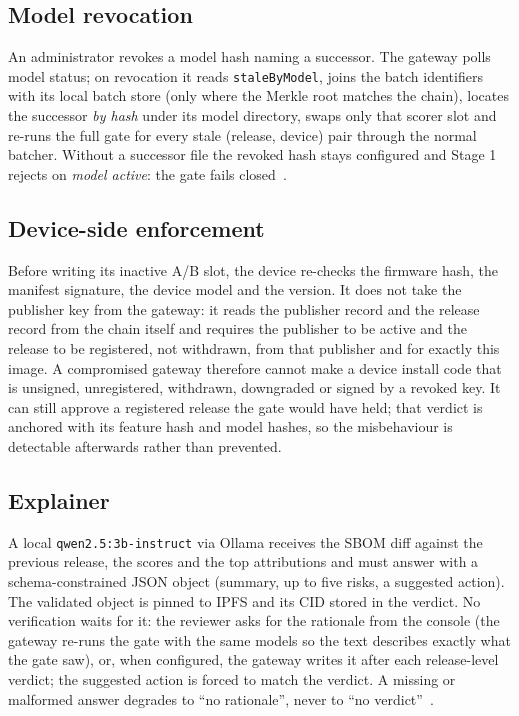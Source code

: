 \documentclass[conference]{IEEEtran}
\begin{document}
\subsection{Model revocation}
An administrator revokes a model hash naming a successor. The gateway polls model status; on
revocation it reads \texttt{staleByModel}, joins the batch identifiers with its local batch
store (only where the Merkle root matches the chain), locates the successor \emph{by hash} under
its model directory, swaps only that scorer slot and re-runs the full gate for every stale
(release, device) pair through the normal batcher. Without a successor file the revoked hash stays
configured and Stage 1 rejects on \emph{model active}: the gate fails closed~\cite{adr9}.

\subsection{Device-side enforcement}
Before writing its inactive A/B slot, the device re-checks the firmware hash, the manifest
signature, the device model and the version. It does not take the publisher key from the gateway:
it reads the publisher record and the release record from the chain itself and requires the
publisher to be active and the release to be registered, not withdrawn, from that publisher and
for exactly this image. A compromised gateway therefore cannot make a device install code that is
unsigned, unregistered, withdrawn, downgraded or signed by a revoked key. It can still approve a
registered release the gate would have held; that verdict is anchored with its feature hash and
model hashes, so the misbehaviour is detectable afterwards rather than prevented.

\subsection{Explainer}
A local \texttt{qwen2.5:3b-instruct} via Ollama receives the SBOM diff against the previous
release, the scores and the top attributions and must answer with a schema-constrained JSON
object (summary, up to five risks, a suggested action). The validated object is pinned to IPFS
and its CID stored in the verdict. No verification waits for it: the reviewer asks for the
rationale from the console (the gateway re-runs the gate with the same models so the text
describes exactly what the gate saw), or, when configured, the gateway writes it after each
release-level verdict; the suggested action is forced to match the verdict. A missing or malformed
answer degrades to ``no rationale'', never to ``no verdict''~\cite{adr2}.
\end{document}
